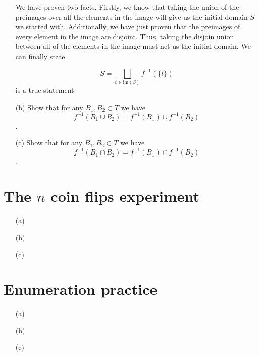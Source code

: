 \documentclass[hidelinks]{article}
\begin{document}
\begin{itemize}
        We have proven two facts. Firstly, we know that taking the union of the preimages over all the elements in the image will give us the initial domain $S$ we started with. Additionally, we have just proven that the preimages of every element in the image are disjoint. Thus, taking the disjoin union between all of the elements in the image must net us the initial domain. We can finally state 

        \[
            S = \bigsqcup_{t \in \text{im}(S)} f^{-1}(\{t\}) 
        \]
        is a true statement








    \item[(b)] Show that for any $B_1,B_2 \subset T$ we have $$f^{-1}(B_1 \cup B_2)=f^{-1}(B_1) \cup f^{-1}(B_2)$$.  

    \item[(c)] Show that for any $B_1,B_2 \subset T$ we have $$f^{-1}(B_1 \cap B_2)=f^{-1}(B_1)\cap f^{-1}(B_2)$$.
\end{itemize}
\newpage

\section*{The $n$ coin flips experiment}
\begin{itemize}
    \item[(a)] 
    \item[(b)] 
    \item[(c)] 
\end{itemize}
\newpage

\section*{Enumeration practice}
\begin{itemize}
    \item[(a)] 
    \item[(b)] 
    \item[(c)] 
\end{itemize}
\end{document}

